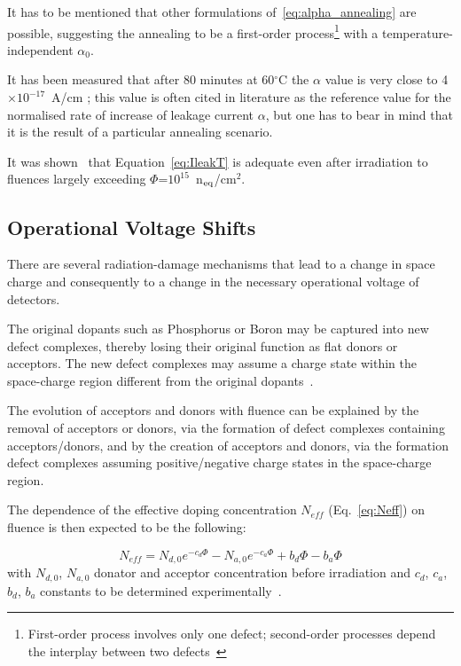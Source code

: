  It has to be mentioned that other formulations of~\ref{eq:alpha_annealing} are possible, 
 suggesting the annealing to be a 
 first-order process\footnote{First-order process involves only one defect; second-order processes 
 depend the interplay between two defects~\cite{Lutz:411172}} with a temperature-independent $\alpha_0$.
 
It has been measured that after 80 minutes at 60$^\circ$C the $\alpha$ value is very close to
 4$\times10^{-17}$~A/cm \cite{moll-thesis}; this value is often cited in literature as the 
 reference value for the normalised rate of increase of leakage current $\alpha$, 
 but one has to bear in mind that 
 it is the result of a particular annealing scenario.

It was shown~\cite{Chilingarov_tscale} that Equation~\ref{eq:IleakT} is adequate even after irradiation 
to fluences largely exceeding $\Phi$=$10^{15}$~n$_{\rm eq}$/cm$^2$.
 
\subsection{Operational Voltage Shifts}

There are several radiation-damage mechanisms that lead to a change in space charge and 
consequently to a change in the necessary operational voltage of detectors.

The original dopants such as Phosphorus or Boron may be captured into new defect complexes, 
thereby losing their original function as flat donors or acceptors. The new defect complexes may 
assume a charge state within the space-charge region different from the original 
dopants~\cite{Lutz:411172}.

The evolution of acceptors and donors with fluence can be explained by the removal of acceptors 
or donors, via the formation of defect complexes containing acceptors/donors, and by the 
creation of acceptors and donors, via the formation defect complexes assuming positive/negative 
charge states in the space-charge region.

The dependence of the effective doping concentration $N_{eff}$ (Eq.~\ref{eq:Neff}) on fluence is then 
expected to be the following:

\begin{equation}
N_{eff}=N_{d,0}e^{-c_d\Phi}-N_{a,0}e^{-c_a\Phi}+b_d\Phi-b_a\Phi
\label{eq:Neff_Fl}
\end{equation}
with $N_{d,0}$, $N_{a,0}$ donator and acceptor concentration before irradiation and $c_d$,
$c_a$, $b_d$, $b_a$ constants to be determined experimentally~\cite{Lutz:411172}.
 

